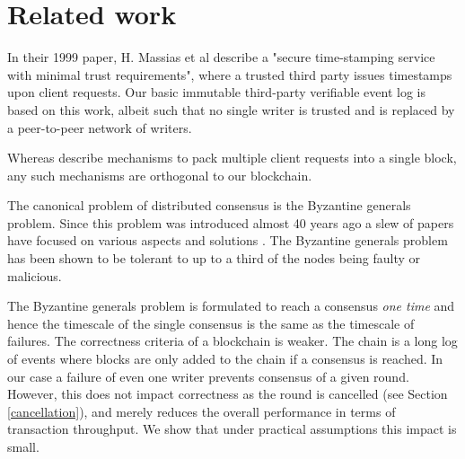 \documentclass[10pt]{article}
\begin{document}
\section{Related work} 

In their 1999 paper, H. Massias et al \cite{massias} describe a "secure time-stamping service with minimal trust requirements", where a trusted third party issues timestamps upon client requests. Our basic immutable third-party verifiable event log is based on this work, albeit such that no single writer is trusted and is replaced by a peer-to-peer network of writers. 

Whereas \cite{massias, satoshi-paper} 
describe mechanisms to pack multiple client requests into a single block, any such mechanisms are orthogonal to our blockchain.

The canonical problem of distributed consensus is the Byzantine generals problem.
Since this problem was introduced almost 40 years ago \cite{byzantine} a slew of papers have focused on various aspects and solutions \cite{bracha, PBFT}. The Byzantine generals problem has been shown to be tolerant to up to a third of the nodes being faulty or malicious.

The Byzantine generals problem is formulated to reach a consensus \emph{one time} and hence the timescale of the single consensus is the same as the timescale of failures. 
The correctness criteria of a blockchain is weaker. The chain is a long log of events where blocks are only added to the chain if a consensus is reached. In our case a failure of even one writer prevents consensus of a given round. However, this does not impact correctness as the round is cancelled (see Section \ref{cancellation}), and merely reduces the overall performance in terms of transaction throughput. We show that under practical assumptions this impact is small.
\end{document}
